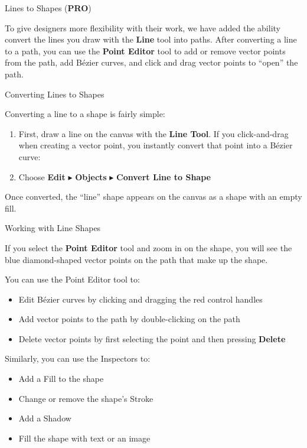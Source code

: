 \documentclass[../main.tex]{subfiles}
\begin{document}
\begin{ogsidebar}
  Lines to Shapes (\textbf{PRO})

  To give designers more flexibility with their work, we have added the ability convert the
  lines you draw with the \textbf{Line} tool into paths. After converting a line to a path,
  you can use the \textbf{Point Editor} tool to add or remove vector points from the path, add
  Bézier curves, and click and drag vector points to ``open'' the path.

  Converting Lines to Shapes

  Converting a line to a shape is fairly simple:

  \begin{enumerate}
    \item First, draw a line on the canvas with the \textbf{Line Tool}. If you click-and-drag
      when creating a vector point, you instantly convert that point into a Bézier curve:

    \item Choose \textbf{Edit} $\blacktriangleright$ \textbf{Objects} $\blacktriangleright$
      \textbf{Convert Line to Shape}

  \end{enumerate}

  Once converted, the ``line'' shape appears on the canvas as a shape with an empty fill.

  Working with Line Shapes

  If you select the \textbf{Point Editor} tool and zoom in on the shape, you will see the blue
  diamond-shaped vector points on the path that make up the shape.


  You can use the Point Editor tool to:

  \begin{itemize}
    \item Edit Bézier curves by clicking and dragging the red control handles
    \item Add vector points to the path by double-clicking on the path
    \item Delete vector points by first selecting the point and then pressing \textbf{Delete}
  \end{itemize}

  Similarly, you can use the Inspectors to:

  \begin{itemize}
    \item Add a Fill to the shape
    \item Change or remove the shape's Stroke
    \item Add a Shadow
    \item Fill the shape with text or an image
  \end{itemize}


\end{ogsidebar}
\end{document}
